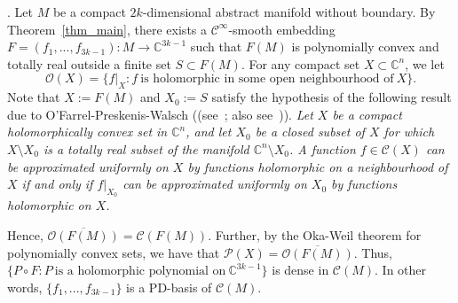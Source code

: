 \documentclass[10pt]{amsart}
\numberwithin{equation}{section}
\theoremstyle{definition}
\theoremstyle{definition}
\theoremstyle{plain}
\newcommand{\bes} {\begin{equation*}}
\newcommand{\ees} {\end{equation*}}
\newcommand{\cont}{\mathcal{C}}
\newcommand{\hol}{\mathcal{O}}
\newcommand{\Cn}{\mathbb{C}^n}
\newcommand{\C} {\mathbb{C}}
\begin{document}
.
Let $M$ be a compact $2k$-dimensional abstract manifold without boundary. By Theorem~\ref{thm_main}, there exists a $\cont^\infty$-smooth embedding $F=(f_1,...,f_{3k-1}):M\rightarrow\C^{3k-1}$ such that $F(M)$ is polynomially convex and totally real outside a finite set $S\subset F(M)$. For any compact set $X\subset\Cn$, we let 
	\bes
		\hol(X)=\{f|_X:f\ \text{is holomorphic in some open neighbourhood of}\ X\}.
	\ees
Note that $X:=F(M)$ and $X_0:=S$ satisfy the hypothesis of the following result due to O'Farrel-Preskenis-Walsch ((see~\cite{OFPrWa84}; also see~\cite{St07})). {\em Let $X$ be a compact holomorphically convex set in $\Cn$, and let $X_0$ be a closed subset of $X$ for which $X\setminus X_0$ is a totally real subset of the manifold $\Cn\setminus X_0$. A function $f\in\cont(X)$ can be approximated uniformly on $X$ by functions holomorphic on a neighbourhood of $X$ if and only if $f|_{X_0}$ can be approximated uniformly on $X_0$ by functions holomorphic on $X$.} 

Hence, $\overline{\hol(F(M))}=\cont(F(M))$. Further, by the Oka-Weil theorem for polynomially convex sets, we have that $\mathcal{P}(X)=\overline{\hol(F(M))}$. Thus, $\{P\circ F:P\ \text{is a holomorphic polynomial on}\ \C^{3k-1}\}$ is dense in $\cont(M)$. In other words, $\{f_1,...,f_{3k-1}\}$ is a PD-basis of $\cont(M)$. 
\end{document}
